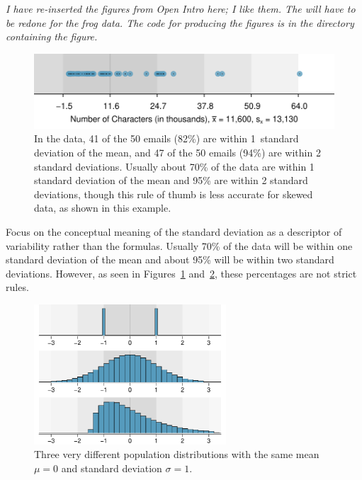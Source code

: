 \begin{doublespace}
\textit{I have re-inserted the figures from Open Intro here; I like them.  The will have to be redone for the frog data.  The code for producing the figures is in the directory containing the figure.}

\begin{figure}
	\centering
	\includegraphics[width=\mycaptionwidth]{ch_intro_to_data_oi_biostat/figures/sdAsRuleForEmailNumChar/sdAsRuleForEmailNumChar}
	\caption{In the  data, 41 of the 50 emails (82\%) are within 1~standard deviation of the mean, and 47 of the 50 emails (94\%) are within 2 standard deviations. Usually about 70\% of the data are within 1 standard deviation of the mean and 95\% are within 2 standard deviations, though this rule of thumb is less accurate for skewed data, as shown in this example.}
	\label{sdAsRuleForEmailNumChar}
\end{figure}

\begin{tipBox}{
		Focus on the conceptual meaning of the standard deviation as a descriptor of variability rather than the formulas. Usually 70\% of the data will be within one standard deviation of the mean and about 95\% will be within two standard deviations. However, as seen in Figures~\ref{sdAsRuleForEmailNumChar} and~\ref{severalDiffDistWithSdOf1}, these percentages are not strict rules.}
\end{tipBox}

\begin{figure}
	\centering
	\includegraphics[width=0.64\textwidth]{ch_intro_to_data_oi_biostat/figures/severalDiffDistWithSdOf1/severalDiffDistWithSdOf1}
	\caption{Three very different population distributions with the same mean $\mu=0$ and standard deviation $\sigma=1$.}
	\label{severalDiffDistWithSdOf1}
\end{figure}


\end{doublespace}
